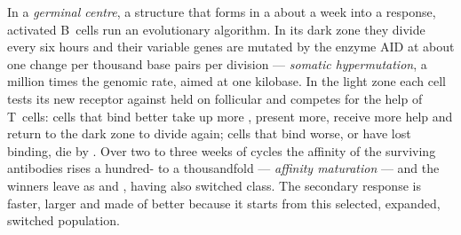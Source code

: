 \begin{definition}\label{def:b3:adaptive-immunity:germinal-centre}
In a \emph{germinal centre}, a structure that forms in a 
about a week into a response, activated B~cells run an evolutionary
algorithm. In its dark zone they divide every six hours and their
 variable genes are mutated by the enzyme AID at about one
change per thousand base pairs per division --- \emph{somatic
hypermutation}, a million times the genomic rate, aimed at one
kilobase. In the light zone each cell tests its new receptor against
 held on follicular  and competes for the help of
T~cells: cells that bind better take up more , present more,
receive more help and return to the dark zone to divide again; cells
that bind worse, or have lost binding, die by . Over two to
three weeks of cycles the affinity of the surviving antibodies rises a
hundred- to a thousandfold --- \emph{affinity maturation} --- and the
winners leave as  and , having also switched
class. The secondary response is faster, larger and made of better
 because it starts from this selected, expanded, switched
population.
\end{definition}

